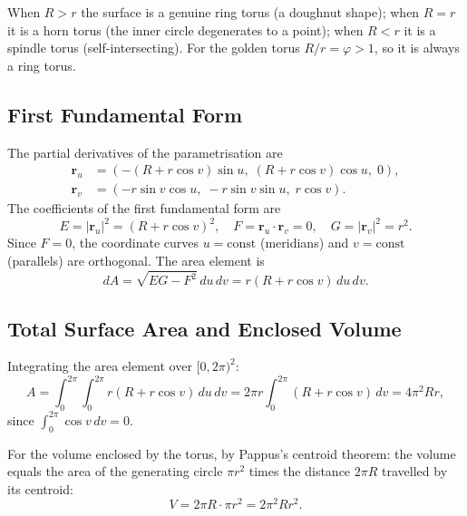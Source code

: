 \begin{remark}
When $R > r$ the surface is a genuine ring torus (a doughnut shape); when $R = r$
it is a horn torus (the inner circle degenerates to a point); when $R < r$ it is
a spindle torus (self-intersecting).
For the golden torus $R/r = \varphi > 1$, so it is always a ring torus.
\end{remark}

\subsection{First Fundamental Form}\label{subsec:ch18-first-fund}

The partial derivatives of the parametrisation are
\begin{align}
  \mathbf{r}_u &= (-(R+r\cos v)\sin u,\; (R+r\cos v)\cos u,\; 0), \\
  \mathbf{r}_v &= (-r\sin v\cos u,\; -r\sin v\sin u,\; r\cos v).
\end{align}
The coefficients of the first fundamental form are
\begin{equation}\label{eq:first-fund}
  E = |\mathbf{r}_u|^2 = (R+r\cos v)^2, \quad
  F = \mathbf{r}_u \cdot \mathbf{r}_v = 0, \quad
  G = |\mathbf{r}_v|^2 = r^2.
\end{equation}
Since $F = 0$, the coordinate curves $u = \text{const}$ (meridians) and
$v = \text{const}$ (parallels) are orthogonal.
The area element is
\begin{equation}\label{eq:area-element}
  dA = \sqrt{EG - F^2}\, du\, dv = r(R + r\cos v)\, du\, dv.
\end{equation}

\subsection{Total Surface Area and Enclosed Volume}\label{subsec:ch18-area-volume}

Integrating the area element over $[0,2\pi)^2$:
\begin{equation}\label{eq:torus-area}
  A = \int_0^{2\pi}\int_0^{2\pi} r(R+r\cos v)\, du\, dv
    = 2\pi r \int_0^{2\pi}(R + r\cos v)\, dv
    = 4\pi^2 R r,
\end{equation}
since $\int_0^{2\pi} \cos v\, dv = 0$.

For the volume enclosed by the torus, by Pappus's centroid theorem:
the volume equals the area of the generating circle $\pi r^2$ times the
distance $2\pi R$ travelled by its centroid:
\begin{equation}\label{eq:torus-volume}
  V = 2\pi R \cdot \pi r^2 = 2\pi^2 R r^2.
\end{equation}

